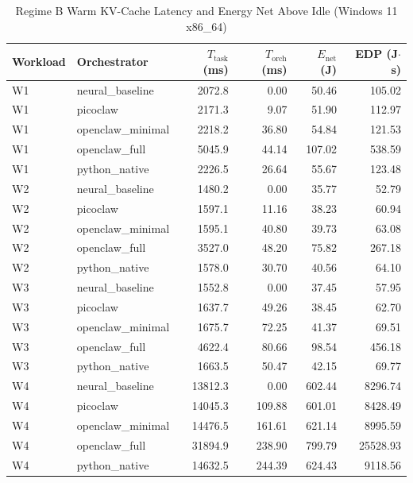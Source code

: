 \begin{table}[t]
\centering\small
\caption{Regime B Warm KV-Cache Latency and Energy Net Above Idle (Windows 11 x86_64)}
\label{tab:Windows_warm_cache}
\begin{tabular}{llrrrr}
\toprule
Workload & Orchestrator & $T_{\text{task}}$ (ms) & $T_{\text{orch}}$ (ms) & $E_{\text{net}}$ (J) & EDP (J$\cdot$s) \\
\midrule
W1 & neural\_baseline & 2072.8 & 0.00 & 50.46 & 105.02 \\
W1 & picoclaw & 2171.3 & 9.07 & 51.90 & 112.97 \\
W1 & openclaw\_minimal & 2218.2 & 36.80 & 54.84 & 121.53 \\
W1 & openclaw\_full & 5045.9 & 44.14 & 107.02 & 538.59 \\
W1 & python\_native & 2226.5 & 26.64 & 55.67 & 123.48 \\
W2 & neural\_baseline & 1480.2 & 0.00 & 35.77 & 52.79 \\
W2 & picoclaw & 1597.1 & 11.16 & 38.23 & 60.94 \\
W2 & openclaw\_minimal & 1595.1 & 40.80 & 39.73 & 63.08 \\
W2 & openclaw\_full & 3527.0 & 48.20 & 75.82 & 267.18 \\
W2 & python\_native & 1578.0 & 30.70 & 40.56 & 64.10 \\
W3 & neural\_baseline & 1552.8 & 0.00 & 37.45 & 57.95 \\
W3 & picoclaw & 1637.7 & 49.26 & 38.45 & 62.70 \\
W3 & openclaw\_minimal & 1675.7 & 72.25 & 41.37 & 69.51 \\
W3 & openclaw\_full & 4622.4 & 80.66 & 98.54 & 456.18 \\
W3 & python\_native & 1663.5 & 50.47 & 42.15 & 69.77 \\
W4 & neural\_baseline & 13812.3 & 0.00 & 602.44 & 8296.74 \\
W4 & picoclaw & 14045.3 & 109.88 & 601.01 & 8428.49 \\
W4 & openclaw\_minimal & 14476.5 & 161.61 & 621.14 & 8995.59 \\
W4 & openclaw\_full & 31894.9 & 238.90 & 799.79 & 25528.93 \\
W4 & python\_native & 14632.5 & 244.39 & 624.43 & 9118.56 \\
\bottomrule
\end{tabular}
\end{table}
